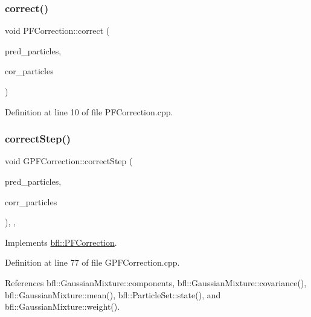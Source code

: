 \subsubsection{\texorpdfstring{correct()}{correct()}}
{\footnotesize\ttfamily void P\+F\+Correction\+::correct (\begin{DoxyParamCaption}\item[{const \mbox{\hyperlink{classbfl_1_1ParticleSet}{bfl\+::\+Particle\+Set}} \&}]{pred\+\_\+particles,  }\item[{\mbox{\hyperlink{classbfl_1_1ParticleSet}{bfl\+::\+Particle\+Set}} \&}]{cor\+\_\+particles }\end{DoxyParamCaption})\hspace{0.3cm}{\ttfamily [inherited]}}



Definition at line 10 of file P\+F\+Correction.\+cpp.

\mbox{\label{classbfl_1_1GPFCorrection_a291a05d78f7f2ee835140bfe4995a2bb}} 
\subsubsection{\texorpdfstring{correct\+Step()}{correctStep()}}
{\footnotesize\ttfamily void G\+P\+F\+Correction\+::correct\+Step (\begin{DoxyParamCaption}\item[{const \mbox{\hyperlink{classbfl_1_1ParticleSet}{bfl\+::\+Particle\+Set}} \&}]{pred\+\_\+particles,  }\item[{\mbox{\hyperlink{classbfl_1_1ParticleSet}{bfl\+::\+Particle\+Set}} \&}]{corr\+\_\+particles }\end{DoxyParamCaption})\hspace{0.3cm}{\ttfamily [override]}, {\ttfamily [protected]}, {\ttfamily [virtual]}}



Implements \mbox{\hyperlink{classbfl_1_1PFCorrection_ae0413156a1258d88485e57a983c89af1}{bfl\+::\+P\+F\+Correction}}.



Definition at line 77 of file G\+P\+F\+Correction.\+cpp.



References bfl\+::\+Gaussian\+Mixture\+::components, bfl\+::\+Gaussian\+Mixture\+::covariance(), bfl\+::\+Gaussian\+Mixture\+::mean(), bfl\+::\+Particle\+Set\+::state(), and bfl\+::\+Gaussian\+Mixture\+::weight().

